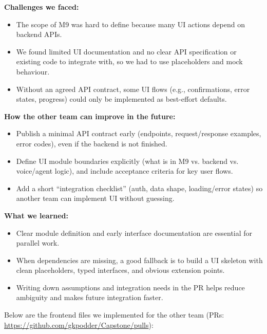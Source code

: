 \documentclass[12pt, titlepage]{article}
\begin{document}
\begin{enumerate}
        \textbf{Challenges we faced:}
        \begin{itemize}
          \item The scope of M9 was hard to define because many UI actions depend on backend
                APIs.
          \item We found limited UI documentation and no clear API specification or existing
                code to integrate with, so we had to use placeholders and mock behaviour.
          \item Without an agreed API contract, some UI flows (e.g., confirmations, error
                states, progress) could only be implemented as best-effort defaults.
        \end{itemize}

        \textbf{How the other team can improve in the future:}
        \begin{itemize}
          \item Publish a minimal API contract early (endpoints, request/response examples,
                error codes), even if the backend is not finished.
          \item Define UI module boundaries explicitly (what is in M9 vs. backend vs.
                voice/agent logic), and include acceptance criteria for key user flows.
          \item Add a short ``integration checklist'' (auth, data shape, loading/error states)
                so another team can implement UI without guessing.
        \end{itemize}

        \textbf{What we learned:}
        \begin{itemize}
          \item Clear module definition and early interface documentation are essential for
                parallel work.
          \item When dependencies are missing, a good fallback is to build a UI skeleton with
                clean placeholders, typed interfaces, and obvious extension points.
          \item Writing down assumptions and integration needs in the PR helps reduce ambiguity
                and makes future integration faster.
        \end{itemize}

        Below are the frontend files we implemented for the other team (PRs:
        \url{https://github.com/gkpodder/Capstone/pulls}):


\end{enumerate}
\end{document}
